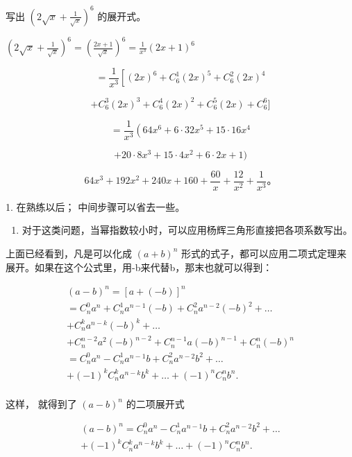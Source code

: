 写出 \(\left(2\sqrt{x} + \frac{1}{\sqrt{x}}\right)^6\) 的展开式。

\(\left(2\sqrt{x} +\frac{1}{\sqrt{x}}\right)^6 = \left(\frac{2x + 1}{\sqrt{x}}\right)^6 = \frac{1}{x^3} (2x + 1)^6\)

\[
= \frac {1}{x ^ {3}} \left[ (2 x) ^ {6} + C _ {6} ^ {1} (2 x) ^ {5} + C _ {6} ^ {2} (2 x) ^ {4} \right.
\]

\[
+ C _ {6} ^ {3} (2 x) ^ {3} + C _ {6} ^ {4} (2 x) ^ {2} + C _ {6} ^ {5} (2 x) + C _ {6} ^ {6} ]
\]

\[
= \frac {1}{x ^ {3}} \left(64 x ^ {6} + 6 \cdot 32 x ^ {5} + 15 \cdot 16 x ^ {4} \right.
\]

\[
+ 20 \cdot 8 x ^ {3} + 15 \cdot 4 x ^ {2} + 6 \cdot 2 x + 1)
\]

\[
64x^3+192x^2+240x+160+\frac{60}{x}+\frac{12}{x^2}+\frac{1}{x^3}\text{。}
\]

 1. 在熟练以后； 中间步骤可以省去一些。

\begin{enumerate}[start=2]
\item
  对于这类问题，当幂指数较小时，可以应用杨辉三角形直接把各项系数写出。
\end{enumerate}

上面已经看到，凡是可以化成 \((a+b)^{n}\)
形式的式子，都可以应用二项式定理来展开。如果在这个公式里，用-b来代替b，那末也就可以得到：

\[
\begin{array}{l} (a - b) ^ {n} = [ a + (- b) ] ^ {n} \\ = C _ {n} ^ {0} a ^ {n} + C _ {n} ^ {1} a ^ {n - 1} (- b) + C _ {n} ^ {2} a ^ {n - 2} (- b) ^ {2} + \dots \\ + C _ {n} ^ {k} a ^ {n - k} (- b) ^ {k} + \dots \\ + C _ {n} ^ {n - 2} a ^ {2} (- b) ^ {n - 2} + C _ {n} ^ {n - 1} a (- b) ^ {n - 1} + C _ {n} ^ {n} (- b) ^ {n} \\ = C _ {n} ^ {0} a ^ {n} - C _ {n} ^ {1} a ^ {n - 1} b + C _ {n} ^ {2} a ^ {n - 2} b ^ {2} + \dots \\ + (- 1) ^ {k} C _ {n} ^ {k} a ^ {n - k} b ^ {k} + \dots + (- 1) ^ {n} C _ {n} ^ {n} b ^ {n}. \\ \end{array}
\]

这样， 就得到了 \((a-b)^{n}\) 的二项展开式

\[
\begin{array}{l} (a - b) ^ {n} = C _ {n} ^ {0} a ^ {n} - C _ {n} ^ {1} a ^ {n - 1} b + C _ {n} ^ {2} a ^ {n - 2} b ^ {2} + \dots \\ + (- 1) ^ {k} C _ {n} ^ {k} a ^ {n - k} b ^ {k} + \dots + (- 1) ^ {n} C _ {n} ^ {n} b ^ {n}. \\ \end{array}
\]

